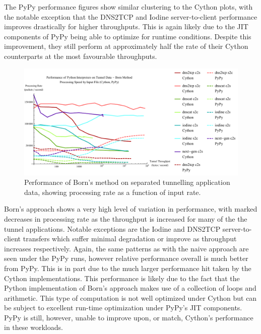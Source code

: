 \documentclass[12pt]{report}
\theoremstyle{remark}
\theoremstyle{definition}
\theoremstyle{definition}
\theoremstyle{definition}
\begin{document}
The PyPy performance figures show similar clustering to the Cython plots, with
the notable exception that the DNS2TCP and Iodine server-to-client performance
improves drastically for higher throughputs. This is again likely due to the JIT
components of PyPy being able to optimize for runtime conditions. Despite this
improvement, they still perform at approximately half the rate of their Cython
counterparts at the most favourable throughputs.

\begin{figure}
\centering
\includegraphics[width=\textwidth]{../figures/ppia-born.pdf}
\caption[Performance of Born's Method on Tunnel Data by Python
Interpreter]{Performance of Born's method on separated tunnelling application
data, showing processing rate as a function of input rate.}
\label{ppia-born}
\end{figure}

Born's approach shows a very high level of variation in performance, with marked
decreases in processing rate as the throughput is increased for many of the the
tunnel applications. Notable exceptions are the Iodine and DNS2TCP
server-to-client transfers which suffer minimal degradation or improve as
throughput increases respectively. Again, the same patterns as with the naive
approach are seen under the PyPy runs, however relative performance overall is much
better from PyPy. This is in part due to the much larger performance hit taken
by the Cython implementations. This performance is likely due to the fact that
the Python implementation of Born's approach makes use of a collection of loops
and arithmetic. This type of computation is not well optimized under Cython but
can be subject to excellent run-time optimization under PyPy's JIT components.
PyPy is still, however, unable to improve upon, or match, Cython's performance in these
workloads.
\end{document}
